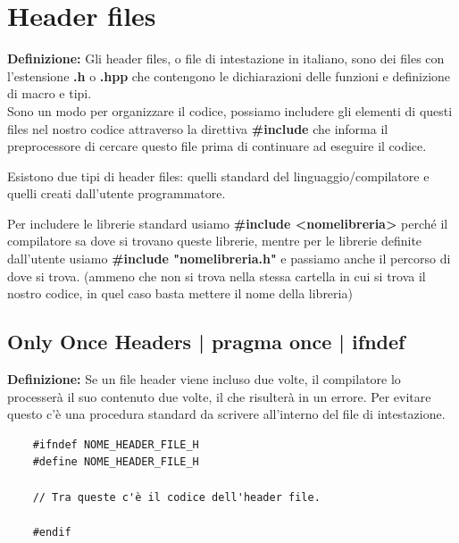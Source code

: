
\newpage

\section{Header files}

\textsf{\small \textbf{Definizione: } Gli header files, o file di intestazione in italiano, sono dei files con l'estensione \textbf{.h} o \textbf{.hpp} che contengono le dichiarazioni delle funzioni e definizione di macro e tipi.}\\

\textsf{\small Sono un modo per organizzare il codice, possiamo includere gli elementi di questi files nel nostro codice attraverso la direttiva \textbf{\#include} che informa il preprocessore di cercare questo file prima di continuare ad eseguire il codice. } 

\textsf{\small Esistono due tipi di header files: quelli standard del linguaggio/compilatore e quelli creati dall'utente programmatore.}

\textsf{\small Per includere le librerie standard usiamo \textbf{\#include <nomelibreria>} perché il compilatore sa dove si trovano queste librerie, mentre per le librerie definite dall'utente usiamo \textbf{\#include "nomelibreria.h"} e passiamo anche il percorso di dove si trova. (ammeno che non si trova nella stessa cartella in cui si trova il nostro codice, in quel caso basta mettere il nome della libreria)} \\

\subsection{Only Once Headers | pragma once | ifndef}

\textsf{\small \textbf{Definizione: } Se un file header viene incluso due volte, il compilatore lo processerà il suo contenuto due volte, il che risulterà in un errore. Per evitare questo c'è una procedura standard da scrivere all'interno del file di intestazione.}

\begin{lstlisting}
	#ifndef NOME_HEADER_FILE_H
	#define NOME_HEADER_FILE_H
	
	// Tra queste c'è il codice dell'header file.
	
	#endif
\end{lstlisting}

